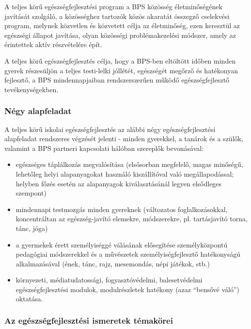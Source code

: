 A teljes körű egészségfejlesztési program a BPS közösség életminőségének
javítását szolgáló, a közösséghez tartozók közös akaratát összegző
cselekvési program, melynek közvetlen és közvetett célja az életminőség,
ezen keresztül az egészségi állapot javítása, olyan közösségi
problémakezelési módszer, amely az érintettek aktív részvételére épít.

A teljes körű egészségfejlesztés célja, hogy a BPS-ben eltöltött időben
minden gyerek részesüljön a teljes testi-lelki jóllétét, egészségét
megőrző és hatékonyan fejlesztő, a BPS mindennapjaiban rendszerszerűen
működő egészségfejlesztő tevékenységekben.

\subsubsection{Négy alapfeladat}\label{nuxe9gy-alapfeladat}

A teljes körű iskolai egészségfejlesztés az alábbi négy
egészségfejlesztési alapfeladat rendszeres végzését jelenti - minden
gyerekkel, a tanárok és a szülők, valamint a BPS partneri kapcsolati
hálóban szereplők bevonásával:

\begin{itemize}

      \item
            egészséges táplálkozás megvalósítása (elsősorban megfelelő, magas
            minőségű, lehetőleg helyi alapanyagokat használó kiszállítóval való
            megállapodással; helyben főzés esetén az alapanyagok
            kiválasztásánál
            legyen elsődleges szempont)
      \item
            mindennapi testmozgás minden gyereknek (változatos
            foglalkozásokkal,
            koncentráltan az egészség-javító elemekre, módszerekre, pl.
            tartásjavító torna, tánc, jóga)
      \item
            a gyermekek érett személyiséggé válásának elősegítése
            személyközpontú
            pedagógiai módszerekkel és a művészetek személyiségfejlesztő
            hatékonyságú alkalmazásával (ének, tánc, rajz, mesemondás, népi
            játékok, stb.)
      \item
            környezeti, médiatudatossági, fogyasztóvédelmi, balesetvédelmi
            egészségfejlesztési modulok, modulrészletek hatékony (azaz
            ``bensővé
            váló'') oktatása.
\end{itemize}

\subsubsection{Az egészségfejlesztési ismeretek
      témakörei}

